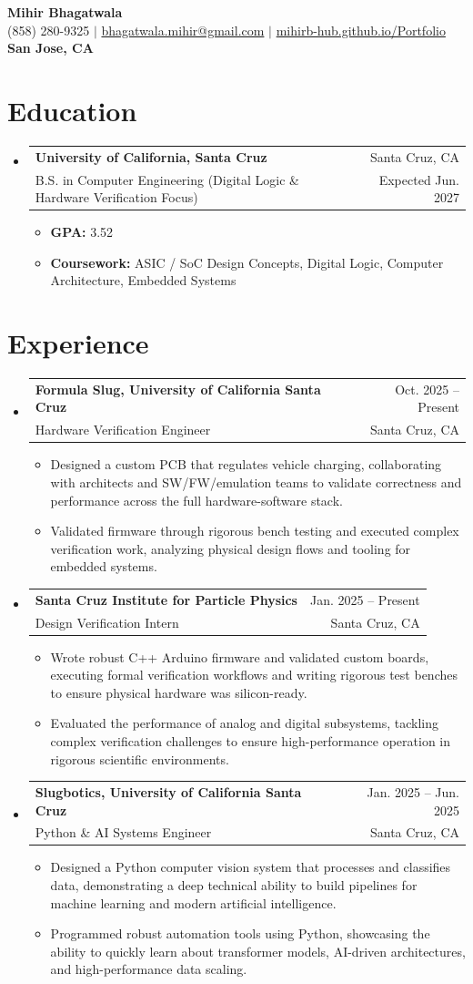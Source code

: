 \documentclass[letterpaper,12pt]{article}
\makeatletter
\newcommand{\resumeItem}[1]{\item{#1}}
\newcommand{\resumeSubheading}[4]{
  \item
    \begin{tabular*}{0.97\textwidth}[t]{l@{\extracolsep{\fill}}r}
      \textbf{#1} & #2 \\
      #3 & #4 \\
    \end{tabular*}
}
\newcommand{\resumeSubHeadingListStart}{\begin{itemize}[label=\textbullet]}
\newcommand{\resumeSubHeadingListEnd}{\end{itemize}}
\newcommand{\resumeItemListStart}{\begin{itemize}[label=-]}
\newcommand{\resumeItemListEnd}{\end{itemize}}
\makeatother
\begin{document}
\begin{center}
  {\Large\bfseries Mihir Bhagatwala} \\
  {(858) 280-9325 $\vert$ \href{mailto:bhagatwala.mihir@gmail.com}{bhagatwala.mihir@gmail.com} $\vert$ \href{https://mihirb-hub.github.io/Portfolio/}{mihirb-hub.github.io/Portfolio}} \\
  {\textbf{San Jose, CA}}
\end{center}

\section{Education}
\resumeSubHeadingListStart
  \resumeSubheading{University of California, Santa Cruz}{Santa Cruz, CA}{B.S. in Computer Engineering (Digital Logic \& Hardware Verification Focus)}{Expected Jun. 2027}
  \resumeItemListStart
    \resumeItem{\textbf{GPA:} 3.52}
    \resumeItem{\textbf{Coursework:} ASIC / SoC Design Concepts, Digital Logic, Computer Architecture, Embedded Systems}
  \resumeItemListEnd
\resumeSubHeadingListEnd

\section{Experience}
\resumeSubHeadingListStart
  \resumeSubheading{Formula Slug, University of California Santa Cruz}{Oct. 2025 -- Present}{Hardware Verification Engineer}{Santa Cruz, CA}
  \resumeItemListStart
    \resumeItem{Designed a custom PCB that regulates vehicle charging, collaborating with architects and SW/FW/emulation teams to validate correctness and performance across the full hardware-software stack.}
    \resumeItem{Validated firmware through rigorous bench testing and executed complex verification work, analyzing physical design flows and tooling for embedded systems.}
  \resumeItemListEnd

  \resumeSubheading{Santa Cruz Institute for Particle Physics}{Jan. 2025 -- Present}{Design Verification Intern}{Santa Cruz, CA}
  \resumeItemListStart
    \resumeItem{Wrote robust C++ Arduino firmware and validated custom boards, executing formal verification workflows and writing rigorous test benches to ensure physical hardware was silicon-ready.}
    \resumeItem{Evaluated the performance of analog and digital subsystems, tackling complex verification challenges to ensure high-performance operation in rigorous scientific environments.}
  \resumeItemListEnd

  \resumeSubheading{Slugbotics, University of California Santa Cruz}{Jan. 2025 -- Jun. 2025}{Python \& AI Systems Engineer}{Santa Cruz, CA}
  \resumeItemListStart
    \resumeItem{Designed a Python computer vision system that processes and classifies data, demonstrating a deep technical ability to build pipelines for machine learning and modern artificial intelligence.}
    \resumeItem{Programmed robust automation tools using Python, showcasing the ability to quickly learn about transformer models, AI-driven architectures, and high-performance data scaling.}
  \resumeItemListEnd
\resumeSubHeadingListEnd
\end{document}
